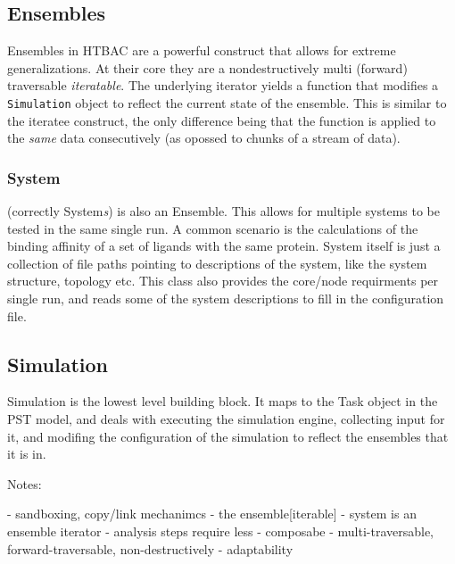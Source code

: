 \subsection{Ensembles}

Ensembles in HTBAC are a powerful construct that allows for extreme generalizations. At their core they are a nondestructively multi (forward) traversable \emph{iteratable}. The underlying iterator yields a function that modifies a \texttt{Simulation} object to reflect the current state of the ensemble. This is similar to the iteratee construct, the only difference being that the function is applied to the \emph{same} data consecutively (as opossed to chunks of a stream of data).


\subsubsection{System}

(correctly System\emph{s}) is also an Ensemble. This allows for multiple systems to be tested in the same single run. A common scenario is the calculations of the binding affinity of a set of ligands with the same protein.
System itself is just a collection of file paths pointing to descriptions of the system, like the system structure, topology etc. This class also provides the core/node requirments per single run, and reads some of the system descriptions to fill in the configuration file.

\subsection{Simulation}

Simulation is the lowest level building block. It maps to the Task object in the PST model, and deals with executing the simulation engine, collecting input for it, and modifing the configuration of the simulation to reflect the ensembles that it is in.



Notes:

- sandboxing, copy/link mechanimcs
- the ensemble[iterable]
- system is an ensemble iterator
- analysis steps require less
- composabe
- multi-traversable, forward-traversable, non-destructively
- adaptability

